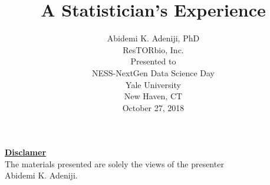 \documentclass{beamer}
\begin{document}
	\title{A Statistician’s Experience}
	\author{Abidemi K. Adeniji, PhD\\ResTORbio, Inc.\\
	\bigskip
	\bigskip
		Presented to\\
		NESS-NextGen Data Science Day\\
		Yale University\\
		New Haven, CT\\
		October 27, 2018}
		\date[]{}
\frame{\titlepage}
\centering
\textbf{\underline{Disclamer}}\\
The materials presented are solely the views of the presenter\\
Abidemi K. Adeniji.
\end{document}
